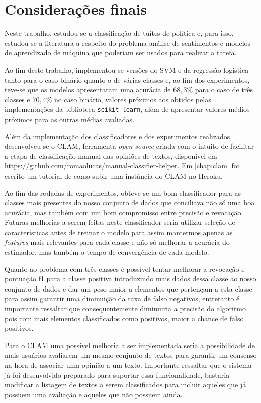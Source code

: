 \chapter{Considerações finais}

Neste trabalho, estudou-se a classificação de tuítes de política e, para isso,
estudou-se a literatura a respeito do problema análise de sentimentos e modelos de
aprendizado de máquina que poderiam ser usados para realizar a tarefa.

Ao fim deste trabalho, implementou-se versões do SVM e da regressão logística
tanto para o caso binário quanto o de várias classes e, ao fim dos experimentos,
teve-se que os modelos apresentaram uma acurácia de $68,3\%$ para o caso
de três classes e $70,4\%$ no caso binário, valores próximos aos
obtidos pelas implementações da biblioteca \texttt{scikit-learn}, além de apresentar
valores médios próximos para as outras médias avaliadas.

Além da implementação dos classificadores e dos experimentos realizados, desenvolveu-se o CLAM,
ferramenta \textit{open source} criada com o intuito de facilitar a etapa de classificação manual
das opiniões de textos, disponível em \url{https://github.com/romaolucas/manual-classifier-helper}.
Em \ref{chap:clam} foi escrito um tutorial de como subir uma instância do CLAM no Heroku.

Ao fim das rodadas de experimentos, obteve-se um bom classificador
para as classes mais presentes do nosso conjunto de dados que conciliava
não só uma boa acurácia, mas também com um bom compromisso entre precisão e
revocação. Futuras melhorias a serem feitas neste classificador seria utilizar
seleção de características antes de treinar o modelo para assim mantermos apenas
as \textit{features} mais relevantes para cada classe e não só melhorar a acurácia
do estimador, mas também o tempo de convergência de cada modelo.

Quanto ao problema com três classes é possível tentar melhorar a revocação e pontuação
f1 para a classe positiva introduzindo mais dados dessa classe ao nosso conjunto de dados
e dar um peso maior a elementos que pertençam a esta classe para assim garantir uma diminuição
da taxa de falso negativos, entretanto é importante ressaltar que consequentemente diminuiria
a precisão do algoritmo pois com mais elementos classificados como positivos, maior a chance
de falso positivos.

Para o CLAM uma possível melhoria a ser implementada seria a possibilidade de mais usuários avaliarem
um mesmo conjunto de textos para garantir um consenso na hora de associar uma opinião a um texto.
Importante ressaltar que o sistema já foi desenvolvido preparado para suportar essa funcionalidade,
bastaria modificar a listagem de textos a serem classificados para incluir aqueles que já possuem
uma avaliação e aqueles que não possuem ainda.


